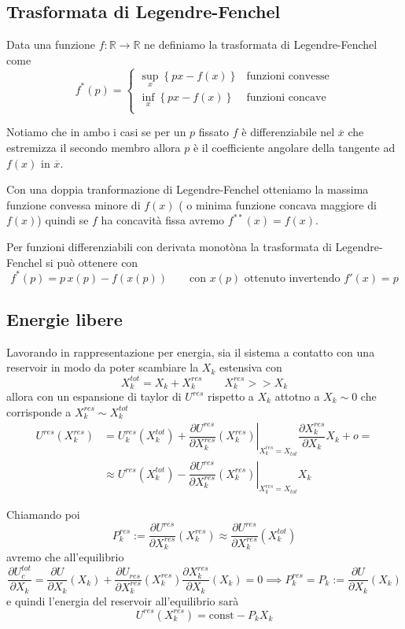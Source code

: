 \documentclass[11pt,a4paper,twoside]{book}
\numberwithin{equation}{section} %
\begin{document}
\subsection{Trasformata di Legendre-Fenchel}

Data una funzione $f:\mathbb{R}\rightarrow\mathbb{R}$ ne definiamo la trasformata di Legendre-Fenchel come
\begin{equation}
f^*(p)=\begin{cases}
\sup_{x}\left\{px-f(x)\right\} & \text{funzioni convesse}\\
\inf_{x}\left\{px-f(x)\right\} & \text{funzioni concave}\\
\end{cases}
\end{equation}

Notiamo che in ambo i casi se per un $p$ fissato $f$ è differenziabile nel $\overline{x}$ che estremizza il secondo membro allora $p$ è il coefficiente angolare della tangente ad $f(x)$ in $\overline{x}$.

Con una doppia tranformazione di Legendre-Fenchel otteniamo la massima funzione convessa minore di $f(x)$ ( o minima funzione concava maggiore di $f(x)$) quindi se $f$ ha concavità fissa avremo $f^{**}(x)=f(x)$.

Per funzioni differenziabili con derivata monotòna la trasformata di Legendre-Fenchel si può ottenere con
\[
f^*(p)=p\,x(p)-f(x(p)) \qquad \text{con } x(p) \text{ ottenuto invertendo } f'(x)=p
\]

\subsection{Energie libere}
Lavorando in rappresentazione per energia, sia il sistema a contatto con una reservoir in modo da poter scambiare la $X_k$ estensiva con
\[
X_k^{tot}=X_k+X_k^{res}\qquad X_k^{res}>>X_k
\]
allora con un espansione di taylor di $U^{res}$ rispetto a $X_k$ attotno a $X_k\sim 0$ che corrisponde a $X_k^{res}\sim X_k^{tot}$
\begin{align*}
U^{res}(X_k^{res}) &= 
U^{res}_{k}(X_k^{tot}) + \left.\dfrac{\partial U^{res}}{\partial X_k^{res}}(X_k^{res})\right|_{X_k^{res}=X_{tot}} \dfrac{\partial X_k^{res}}{\partial X_k} X_k + o = \\
&\approx U^{res}(X_k^{tot}) - \left.\dfrac{\partial U^{res}}{\partial X_k^{res}}(X_k^{res})\right|_{X_k^{res}=X_{tot}}X_k
\end{align*}

Chiamando poi
\begin{equation}
P_k^{res}:=\dfrac{\partial U^{res}}{\partial X_k^{res}}(X_k^{res})\approx\dfrac{\partial U^{res}}{\partial X_k^{res}}(X_k^{tot})
\end{equation}
avremo che all'equilibrio
\[
\dfrac{\partial U_c^{tot} }{\partial X_k}=\dfrac{\partial U}{\partial X_k}(X_k)+\dfrac{\partial U_{res}}{\partial X_k^{res}}(X_k^{res})\dfrac{\partial X_k^{res}}{\partial X_k}(X_k)=0 \implies P_k^{res}=P_k:=\dfrac{\partial U}{\partial X_k}(X_k)
\]
e quindi l'energia del reservoir all'equilibrio sarà
\begin{equation}
U^{res}(X_k^{res}) = \text{const} - P_k X_k
\end{equation}
\end{document}
